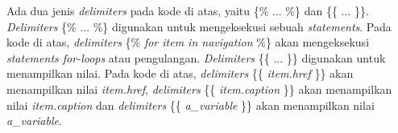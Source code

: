 Ada dua jenis \textit{delimiters} pada kode di atas, yaitu \{\% ... \%\} dan \{\{ ... \}\}. \textit{Delimiters} \{\% ... \%\} digunakan untuk mengeksekusi sebuah \textit{statements}. Pada kode di atas, \textit{delimiters} \{\% \textit{for item in navigation} \%\} akan mengeksekusi \textit{statements for-loops} atau pengulangan. \textit{Delimiters} \{\{ ... \}\} digunakan untuk menampilkan nilai. Pada kode di atas, \textit{delimiters} \{\{ \textit{item.href} \}\} akan menampilkan nilai \textit{item.href}, \textit{delimiters} \{\{ \textit{item.caption} \}\} akan menampilkan nilai \textit{item.caption} dan \textit{delimiters} \{\{ \textit{a\_variable} \}\} akan menampilkan nilai \textit{a\_variable}.
